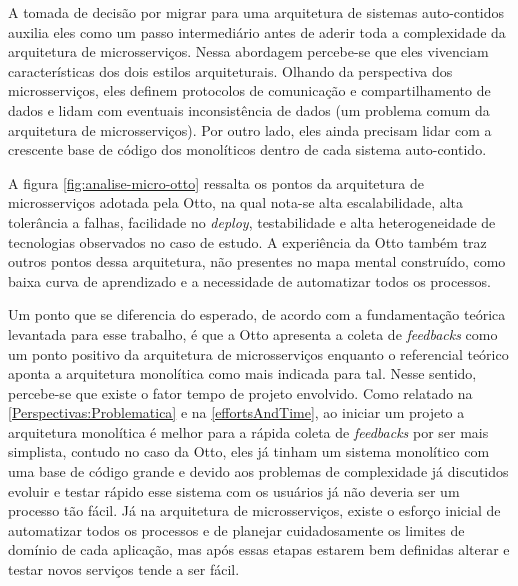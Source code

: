 A tomada de decisão por migrar para uma arquitetura de sistemas auto-contidos auxilia eles como um
passo intermediário antes de aderir toda a complexidade da arquitetura de microsserviços. Nessa
abordagem percebe-se que eles vivenciam características dos dois estilos arquiteturais. Olhando da
perspectiva dos microsserviços, eles definem protocolos de comunicação e compartilhamento de dados e lidam
com eventuais inconsistência de dados (um problema comum da arquitetura de microsserviços). Por
outro lado, eles ainda precisam lidar com a crescente base de código dos monolíticos dentro de cada
sistema auto-contido.

A figura \autoref{fig:analise-micro-otto} ressalta os pontos da arquitetura de microsserviços
adotada pela Otto, na qual nota-se alta escalabilidade, alta tolerância a falhas, facilidade no
\textit{deploy}, testabilidade e alta heterogeneidade de tecnologias observados no caso de estudo.
A experiência da Otto também traz outros pontos dessa arquitetura, não presentes no mapa mental
construído, como baixa curva de aprendizado e a necessidade de automatizar todos os processos.  

Um ponto que se diferencia do esperado, de acordo com a fundamentação teórica levantada para esse
trabalho, é que a Otto apresenta a coleta de \textit{feedbacks} como um ponto positivo da
arquitetura de microsserviços enquanto o referencial teórico aponta a arquitetura monolítica como
mais indicada para tal. Nesse sentido, percebe-se que existe o fator tempo de projeto envolvido.
Como relatado na \autoref{Perspectivas:Problematica} e na \autoref{effortsAndTime}, ao iniciar um
projeto a arquitetura monolítica é melhor para a rápida coleta de \textit{feedbacks} por ser mais
simplista, contudo no caso da Otto, eles já tinham um sistema monolítico com uma base de código
grande e devido aos problemas de complexidade já discutidos evoluir e testar rápido esse sistema com
os usuários já não deveria ser um processo tão fácil. Já na arquitetura de microsserviços, existe o
esforço inicial de automatizar todos os processos e de planejar cuidadosamente os limites de domínio
de cada aplicação, mas após essas etapas estarem bem definidas alterar e testar novos serviços tende
a ser fácil.

